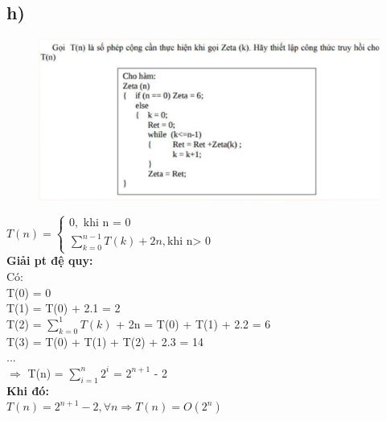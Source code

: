 \documentclass[10pt,a4paper]{article}
\begin{document}
\subsection*{h)}
\begin{figure}[H]
    \centering
    \includegraphics[scale=.7]{images/1h.png}
    \label{fig:my_label}
\end{figure}
$
T(n) = 
    \begin{cases}
        0, \text{ khi n = 0} \\
        \sum_{k=0}^{n-1}T(k) + 2n, \text{khi n> 0}
    \end{cases}
$ \\
\textbf{Giải pt đệ quy: } \\
Có: \\
T(0) = 0 \\
T(1) = T(0) + 2.1 = 2 \\
T(2) = $\sum_{k=0}^{1}{T(k)}$ + 2n = T(0) + T(1) + 2.2 = 6 \\
T(3) = T(0) + T(1) + T(2) + 2.3 = 14 \\ ... \\
$\Rightarrow$ T(n) = $\sum_{i=1}^{n}{2^i}$ = $2^{n+1}$ - 2 \\
\textbf{Khi đó: }\\
$
T(n) = 2^{n+1} - 2, \forall n \Rightarrow T(n) = O(2^n)
$ \\
\end{document}
